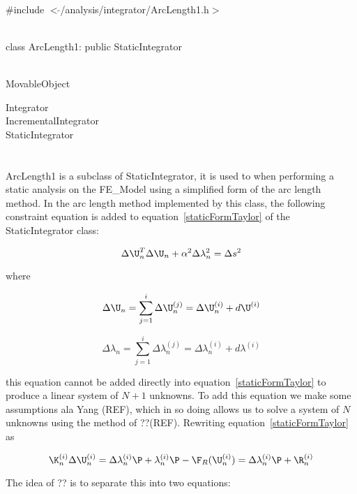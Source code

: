 
   \\
\#include $<\tilde{ }$/analysis/integrator/ArcLength1.h$>$  


  \\
class ArcLength1: public StaticIntegrator  


 \\
MovableObject 

\indent\indent Integrator \\
\indent\indent\indent IncrementalIntegrator \\
\indent\indent\indent\indent StaticIntegrator \\
\indent\indent\indent\indent{} \\

 \\ 
\indent ArcLength1 is a subclass of StaticIntegrator, it is
used to when performing a static analysis on the FE\_Model using a
simplified form of the arc length method. In the arc length method
implemented by this class, the following constraint equation is added to
equation~\ref{staticFormTaylor} of the StaticIntegrator class: 

\begin{equation}
\Delta \U_n^T \Delta \U_n  + \alpha^2 \Delta \lambda_n^2  = \Delta s^2
\end{equation}

where 

$$
\Delta \U_n = \sum_{j=1}^{i} \Delta \U_n^{(j)} = \Delta \U_n^{(i)} +
d\U^{(i)} 
$$


$$
\Delta \lambda_n = \sum_{j=1}^{i} \Delta \lambda_n^{(j)} = \Delta \lambda_n^{(i)} +
d\lambda^{(i)} 
$$


\noindent this equation cannot be added directly into
equation~\ref{staticFormTaylor} to produce a linear system of $N+1$
unknowns. To add this equation we make some assumptions ala Yang
(REF), which in so doing allows us to solve a system of $N$
unknowns using the method of ??(REF).  Rewriting
equation~\ref{staticFormTaylor} as  

$$
\K_n^{(i)} \Delta \U_n^{(i)} = \Delta \lambda_n^{(i)} \P +
\lambda_n^{(i)} \P - \F_R(\U_n^{(i)}) = \Delta \lambda_n^{(i)} \P + \R_n^{(i)}
$$


\noindent The idea of ?? is to separate this into two equations:

